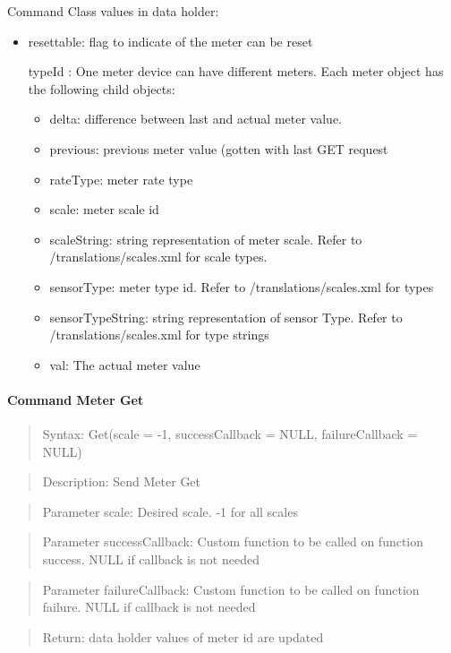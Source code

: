 Command Class values in data holder:
\begin{itemize}
\item resettable: flag to indicate of the meter can be reset
\item [typeId]: One meter device can have different meters. Each meter object has the following child objects:
\begin{itemize}
\item delta: difference between last and actual meter value.
\item previous: previous meter value (gotten with last GET request
\item rateType: meter rate type
\item scale: meter scale id
\item scaleString: string representation of meter scale. Refer to  /translations/scales.xml for scale types. 
\item sensorType: meter type id. Refer to  /translations/scales.xml for types
\item sensorTypeString: string representation of sensor Type. Refer to  /translations/scales.xml for type strings
\item val: The actual meter value
\end{itemize}
\end{itemize}

\paragraph {Command Meter Get}
\begin{quote} Syntax: Get(scale = -1, successCallback = NULL, failureCallback = NULL)\end{quote}
\begin{quote} Description: Send Meter Get\end{quote}
\begin{quote} Parameter scale: Desired scale. -1 for all scales\end{quote}
\begin{quote} Parameter successCallback: Custom function to be called on function success. NULL if callback is not needed\end{quote}
\begin{quote} Parameter failureCallback: Custom function to be called on function failure. NULL if callback is not needed\end{quote}
\begin{quote} Return: data holder values of meter id are updated \end{quote}

